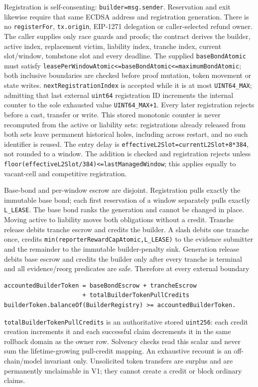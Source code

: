 \documentclass[a4paper,11pt]{article}
\newcommand{\code}[1]{\nolinkurl{#1}}
\begin{document}
Registration is self-consenting: \code{builder=msg.sender}.  Reservation and
exit likewise require that same ECDSA address and registration generation.
There is no \code{registerFor}, \code{tx.origin}, EIP-1271 delegation or
caller-selected refund owner.  The caller supplies only race guards and proofs;
the contract derives the builder, active index, replacement victim, liability
index, tranche index, current slot/window, tombstone slot and every deadline.
The supplied \code{baseBondAtomic} must satisfy
\code{leasePerWindowAtomic<=baseBondAtomic<=maximumBondAtomic}; both inclusive
boundaries are checked before proof mutation, token movement or state writes.
\code{nextRegistrationIndex} is accepted while it is at most
\code{UINT64_MAX}; admitting that last external \code{uint64} registration ID
increments the internal counter to the sole exhausted value
\code{UINT64_MAX+1}.  Every later registration rejects before a cast, transfer
or write.  This stored monotonic counter is never recomputed from the active or
liability sets: registrations already released from both sets leave permanent
historical holes, including across restart, and no such identifier is reused.
The entry delay is
\code{effectiveL2Slot=currentL2Slot+8*384}, not rounded to a window.  The
addition is checked and registration rejects unless
\code{floor(effectiveL2Slot/384)<=lastManagedWindow}; this applies equally to
vacant-cell and competitive registration.

Base-bond and per-window escrow are disjoint.  Registration pulls exactly the
immutable base bond; each first reservation of a window separately pulls
exactly \code{L_LEASE}.  The base bond ranks the generation and cannot be
changed in place.  Moving active to liability moves both obligations without a
credit.  Tranche release debits tranche escrow and credits the builder.  A
slash debits one tranche once, credits
\code{min(reporterRewardCapAtomic,L_LEASE)} to the evidence submitter and the
remainder to the immutable builder-penalty sink.  Generation release debits
base escrow and credits the builder only after every tranche is terminal and
all evidence/reorg predicates are safe.  Therefore at every external boundary
\begin{verbatim}
accountedBuilderToken = baseBondEscrow + trancheEscrow
                      + totalBuilderTokenPullCredits
builderToken.balanceOf(BuilderRegistry) >= accountedBuilderToken.
\end{verbatim}
\code{totalBuilderTokenPullCredits} is an authoritative stored \code{uint256}:
each credit creation increments it and each successful claim decrements it in
the same rollback domain as the owner row.  Solvency checks read this scalar and
never sum the lifetime-growing pull-credit mapping.  An exhaustive recount is
an off-chain/model invariant only.
Unsolicited token transfers are surplus and are permanently unclaimable in V1;
they cannot create a credit or block ordinary claims.
\end{document}
